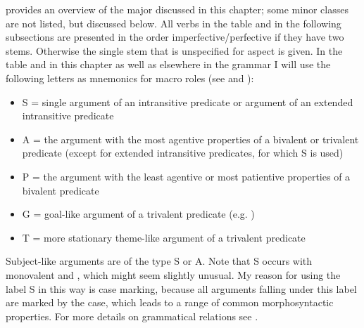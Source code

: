  provides an overview of the major  discussed in this chapter; some minor classes are not listed, but discussed below. All verbs in the table and in the following subsections are presented in the order imperfective\slash perfective if they have two stems. Otherwise the single stem that is unspecified for aspect is given. In the table and in this chapter as well as elsewhere in the grammar I will use the following letters as mnemonics for macro roles (see \citet{Bickel2011} and \citet{Bickel.etal2015}): 
%
\begin{itemize}
	\item S = single argument of an intransitive predicate or  argument of an extended intransitive predicate
	\item A = the argument with the most agentive properties of a bivalent or trivalent predicate (except for extended intransitive predicates, for which S is used)
	\item P = the argument with the least agentive or most patientive properties of a bivalent predicate
	\item G = goal-like argument of a trivalent predicate (e.g. )
	\item T = more stationary theme-like argument of a trivalent predicate 
	\end{itemize}
Subject-like arguments are of the type S or A. Note that S occurs with monovalent and , which might seem slightly unusual. My reason for using the label S in this way is case marking, because all arguments falling under this label are marked by the  case, which leads to a range of common morphosyntactic properties. For more details on grammatical relations see .

